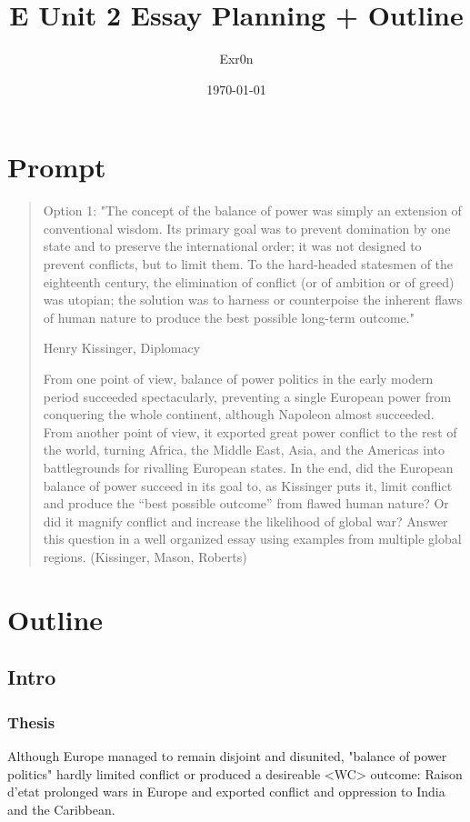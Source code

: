 \documentclass[11pt]{article}
\author{Exr0n}
\date{\today}
\title{E Unit 2 Essay Planning + Outline}
\begin{document}
\maketitle
\tableofcontents

\section{Prompt}
\label{sec:org099cf4a}
\begin{quote}
Option 1: "The concept of the balance of power was simply an extension of conventional wisdom. Its primary goal was to prevent domination by one state and to preserve the international order; it was not designed to prevent conflicts, but to limit them. To the hard-headed statesmen of the eighteenth century, the elimination of conflict (or of ambition or of greed) was utopian; the solution was to harness or counterpoise the inherent flaws of human nature to produce the best possible long-term outcome."

Henry Kissinger, Diplomacy

From one point of view, balance of power politics in the early modern period succeeded spectacularly, preventing a single European power from conquering the whole continent, although Napoleon almost succeeded. From another point of view, it exported great power conflict to the rest of the world, turning Africa, the Middle East, Asia, and the Americas into battlegrounds for rivalling European states. In the end, did the European balance of power succeed in its goal to, as Kissinger puts it, limit conflict and produce the “best possible outcome” from flawed human nature? Or did it magnify conflict and increase the likelihood of global war? Answer this question in a well organized essay using examples from multiple global regions.  (Kissinger, Mason, Roberts)
\end{quote}
\section{Outline}
\label{sec:org5fee3fe}
\subsection{Intro}
\label{sec:org76c00f3}
\subsubsection{Thesis}
\label{sec:orga00b948}
Although Europe managed to remain disjoint and disunited, "balance of power politics" hardly limited conflict or produced a desireable <WC> outcome: Raison d'etat prolonged wars in Europe and exported conflict and oppression to India and the Caribbean.
\end{document}
